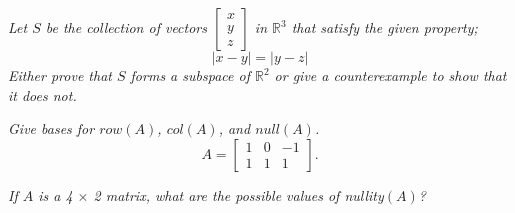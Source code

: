 \documentclass[12pt,letterpaper]{hmcpset}
\begin{document}
\section*{}





\begin{problem}[3.5.8]
    \textit{Let $S$ be the collection of vectors $\begin{bmatrix} x\\ y\\ z\end{bmatrix}$ in $\mathbb{R}^3$ that satisfy the given property;
    $$ |x-y|=|y-z|$$
     Either prove that $S$ forms a subspace of $\mathbb{R}^2$ or give a counterexample to show that it does not.}
\end{problem}

\begin{solution}
    \vfill
\end{solution}

\newpage


\begin{problem}[3.5.17]
    \textit{Give bases for $row(A)$, $col(A)$, and $null(A)$.}
    \[A = 
    \begin{bmatrix}
    1& 0& -1 \\
    1& 1&  1
    \end{bmatrix}.
    \]
    
\end{problem}

\begin{solution}
    \vfill
\end{solution}

\newpage


\begin{problem}[3.5.42]
    \textit{If $A$ is a 4 $\times$ 2 matrix, what are the possible values of nullity$(A)$?}
\end{problem}

\begin{solution}
    \vfill
\end{solution}
\end{document}

